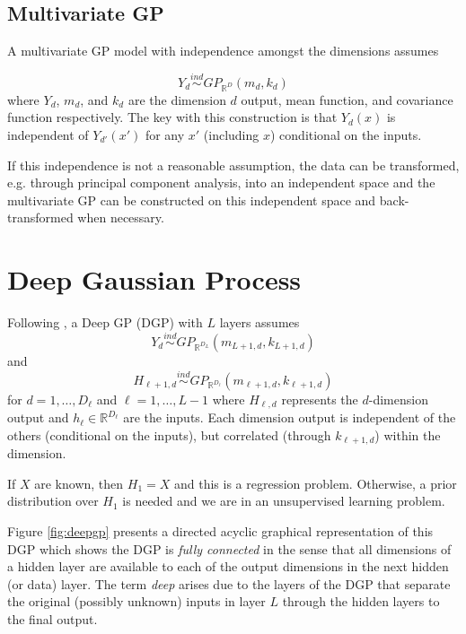 \documentclass{article}
\newcommand{\ind}{\stackrel{ind}{\sim}}
\newcommand{\1}{\mathbbm{1}}
\begin{document}
\subsection{Multivariate GP}

A multivariate GP model with independence amongst the dimensions assumes 

\[
Y_d \ind GP_{\mathbb{R}^{D}}(m_{d},k_{d}) 
\]
where $Y_d$, $m_d$, and $k_d$ are the dimension $d$ output, mean function, 
and covariance function respectively.
The key with this construction is that $Y_d(x)$ is independent of 
$Y_{d'}(x')$ for any $x'$ (including $x$) conditional on the inputs. 

If this independence is not a reasonable assumption, 
the data can be transformed, 
e.g. through principal component analysis, into an independent space and
the multivariate GP can be constructed on this independent space and 
back-transformed when necessary.




\section{Deep Gaussian Process}
\label{sec:deepgp}

Following \cite{damianou2013deep}, 
a Deep GP (DGP) with $L$ layers assumes 
\[
Y_d \ind GP_{\mathbb{R}^{D_L}}(m_{L+1,d},k_{L+1,d}) 
\]
and
\[
H_{\ell+1,d} \ind GP_{\mathbb{R}^{D_\ell}}(m_{\ell+1,d},k_{\ell+1,d}) 
\]
for $d=1,\ldots,D_{\ell}$ and $\ell = 1,\ldots,L-1$
where $H_{\ell,d}$ represents the $d$-dimension output and 
$h_{\ell} \in \mathbb{R}^{D_{\ell}}$ are the inputs.
Each dimension output is independent of the others (conditional on the inputs), 
but correlated (through $k_{\ell+1,d}$) within the dimension.

If $X$ are known, then $H_1 = X$ and this is a regression problem.
Otherwise, a prior distribution over $H_1$ is needed and we are in an 
unsupervised learning problem.

Figure \ref{fig:deepgp} presents a directed acyclic graphical representation
of this DGP which shows the DGP is \emph{fully connected} in the sense that all 
dimensions of a hidden layer are available to each of the output dimensions 
in the next hidden (or data) layer. 
The term \emph{deep} arises due to the layers of the DGP that separate
the original (possibly unknown) inputs in layer $L$ through the hidden layers
to the final output.

\end{document}
